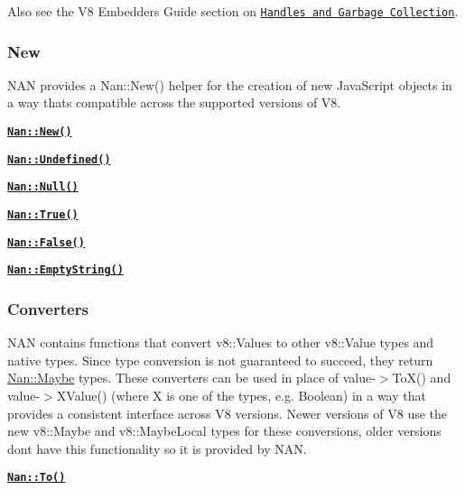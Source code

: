 Also see the V8 Embedders Guide section on \href{https://developers.google.com/v8/embed#handles}{\tt Handles and Garbage Collection}.

\subsubsection*{New}

N\+AN provides a {\ttfamily Nan\+::\+New()} helper for the creation of new Java\+Script objects in a way that\textquotesingle{}s compatible across the supported versions of V8.


\begin{DoxyItemize}
\item \href{doc/new.md#api_nan_new}{\tt {\bfseries {\ttfamily Nan\+::\+New()}}}
\item \href{doc/new.md#api_nan_undefined}{\tt {\bfseries {\ttfamily Nan\+::\+Undefined()}}}
\item \href{doc/new.md#api_nan_null}{\tt {\bfseries {\ttfamily Nan\+::\+Null()}}}
\item \href{doc/new.md#api_nan_true}{\tt {\bfseries {\ttfamily Nan\+::\+True()}}}
\item \href{doc/new.md#api_nan_false}{\tt {\bfseries {\ttfamily Nan\+::\+False()}}}
\item \href{doc/new.md#api_nan_empty_string}{\tt {\bfseries {\ttfamily Nan\+::\+Empty\+String()}}}
\end{DoxyItemize}

\subsubsection*{Converters}

N\+AN contains functions that convert {\ttfamily v8\+::\+Value}s to other {\ttfamily v8\+::\+Value} types and native types. Since type conversion is not guaranteed to succeed, they return {\ttfamily \hyperlink{class_nan_1_1_maybe}{Nan\+::\+Maybe}} types. These converters can be used in place of {\ttfamily value-\/$>$To\+X()} and {\ttfamily value-\/$>$X\+Value()} (where {\ttfamily X} is one of the types, e.\+g. {\ttfamily Boolean}) in a way that provides a consistent interface across V8 versions. Newer versions of V8 use the new {\ttfamily v8\+::\+Maybe} and {\ttfamily v8\+::\+Maybe\+Local} types for these conversions, older versions don\textquotesingle{}t have this functionality so it is provided by N\+AN.


\begin{DoxyItemize}
\item \href{doc/converters.md#api_nan_to}{\tt {\bfseries {\ttfamily Nan\+::\+To()}}}
\end{DoxyItemize}

